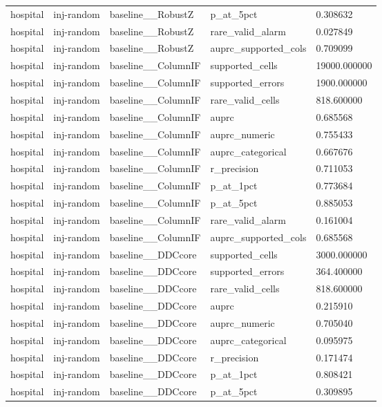 \begin{tabular}{lllll}
hospital & inj-random & baseline\_\_RobustZ & p\_at\_5pct & 0.308632 \\
hospital & inj-random & baseline\_\_RobustZ & rare\_valid\_alarm & 0.027849 \\
hospital & inj-random & baseline\_\_RobustZ & auprc\_supported\_cols & 0.709099 \\
hospital & inj-random & baseline\_\_ColumnIF & supported\_cells & 19000.000000 \\
hospital & inj-random & baseline\_\_ColumnIF & supported\_errors & 1900.000000 \\
hospital & inj-random & baseline\_\_ColumnIF & rare\_valid\_cells & 818.600000 \\
hospital & inj-random & baseline\_\_ColumnIF & auprc & 0.685568 \\
hospital & inj-random & baseline\_\_ColumnIF & auprc\_numeric & 0.755433 \\
hospital & inj-random & baseline\_\_ColumnIF & auprc\_categorical & 0.667676 \\
hospital & inj-random & baseline\_\_ColumnIF & r\_precision & 0.711053 \\
hospital & inj-random & baseline\_\_ColumnIF & p\_at\_1pct & 0.773684 \\
hospital & inj-random & baseline\_\_ColumnIF & p\_at\_5pct & 0.885053 \\
hospital & inj-random & baseline\_\_ColumnIF & rare\_valid\_alarm & 0.161004 \\
hospital & inj-random & baseline\_\_ColumnIF & auprc\_supported\_cols & 0.685568 \\
hospital & inj-random & baseline\_\_DDCcore & supported\_cells & 3000.000000 \\
hospital & inj-random & baseline\_\_DDCcore & supported\_errors & 364.400000 \\
hospital & inj-random & baseline\_\_DDCcore & rare\_valid\_cells & 818.600000 \\
hospital & inj-random & baseline\_\_DDCcore & auprc & 0.215910 \\
hospital & inj-random & baseline\_\_DDCcore & auprc\_numeric & 0.705040 \\
hospital & inj-random & baseline\_\_DDCcore & auprc\_categorical & 0.095975 \\
hospital & inj-random & baseline\_\_DDCcore & r\_precision & 0.171474 \\
hospital & inj-random & baseline\_\_DDCcore & p\_at\_1pct & 0.808421 \\
hospital & inj-random & baseline\_\_DDCcore & p\_at\_5pct & 0.309895 \\

\end{tabular}
